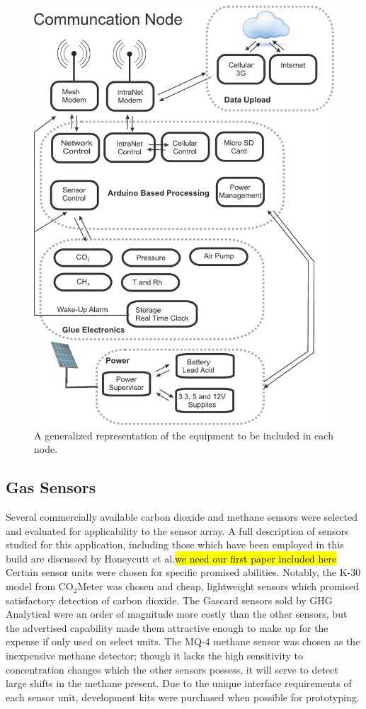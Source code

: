 \documentclass[journal]{IEEEtran}
\begin{document}
\begin{figure}[!t]
	\centering
	\includegraphics[width=\columnwidth,height=\columnwidth,keepaspectratio]{outline.pdf}
	\caption[Equipment outline]{A generalized representation of the equipment to be included in each node.}
	\label{fig:outline}
\end{figure}

\subsection{Gas Sensors}

Several commercially available carbon dioxide and methane sensors were selected and evaluated for applicability to the sensor array. A full description of sensors studied for this application, including those which have been employed in this build are discussed by Honeycutt et al.\hl{we need our first paper included here}  Certain sensor units were chosen for specific promised abilities.  Notably, the K-30 model from CO$_2$Meter was chosen and cheap, lightweight sensors which promised satisfactory detection of carbon dioxide.  The Gascard sensors sold by GHG Analytical were an order of magnitude more costly than the other sensors, but the advertised capability made them attractive enough to make up for the expense if only used on select units.  The MQ-4 methane sensor was chosen as the inexpensive methane detector; though it lacks the high sensitivity to concentration changes which the other sensors possess, it will serve to detect large shifts in the methane present.  Due to the unique interface requirements of each sensor unit, development kits were purchased when possible for prototyping.  
\end{document}
